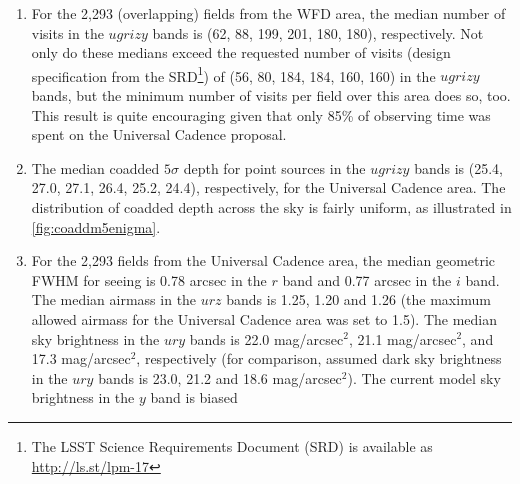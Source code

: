 \begin{enumerate}
{here: (23.62, 24.85, 24.39, 23.94, 23.36, 22.45) in the $ugrizy$
bands, respectively. These values are similar, but not identical, to the values
listed in Table 2 from the latest version (v3.1) of the LSST overview
paper: (23.68, 24.89, 24.43, 24.00, 23.45, 22.60). This discrepancy
is due to continuing improvements in the system performance estimates.}.
These values are shallower than
the zenith dark time values for two main reasons: the sky is expected to be
brighter for non-dark time and away from zenith, the sky brightness model
currently implemented in \OpSim has some shortcomings (a new model will
be implemented in version 4), and the moon avoidance is not as aggressive
as it could be (many observations are taken very close to the moon avoidance limit of 30 degrees, rather than farther away where the sky is darker). As a result, the limiting depths above are biased bright by close
to 1 mag in the $z$ and $y$ bands, and a few tenths of a magnitude in the
$u$, $g$ and $i$ bands. The co-added depths are tied to single-visit bands,
and suffer from the same bias.
\item For the 2,293 (overlapping) fields from the WFD area,
the median number of visits in the $ugrizy$ bands is (62, 88, 199, 201, 180,
180), respectively. Not only do these medians exceed the requested
number of visits (design specification from the SRD\footnote{The LSST
Science Requirements Document (SRD) is available as
\url{http://ls.st/lpm-17}}) of (56, 80, 184, 184, 160, 160) in the $ugrizy$
bands, but the minimum number of visits per field over this area does
so, too. This result is quite encouraging given that
only 85\% of observing time was spent on the Universal Cadence proposal.
\item The median coadded $5\sigma$ depth
for point sources in the $ugrizy$ bands is (25.4, 27.0, 27.1, 26.4,
25.2, 24.4), respectively, for the Universal Cadence area. The distribution
of coadded depth across the sky is fairly uniform, as illustrated in \autoref{fig:coaddm5enigma}.
\item For the 2,293 fields from the Universal Cadence area, the median
geometric FWHM for seeing is 0.78 arcsec in the $r$ band and 0.77 arcsec
in the $i$ band. The median airmass in the $urz$ bands is 1.25, 1.20 and 1.26
(the maximum allowed airmass for the Universal Cadence area was set to
1.5).  The median sky brightness in the $ury$ bands is 22.0 mag/arcsec$^2$,
21.1 mag/arcsec$^2$, and 17.3 mag/arcsec$^2$, respectively (for comparison,
assumed dark sky brightness in the $ury$ bands is 23.0, 21.2 and 18.6
mag/arcsec$^2$).  The current model sky brightness in the $y$ band is biased

\end{enumerate}
